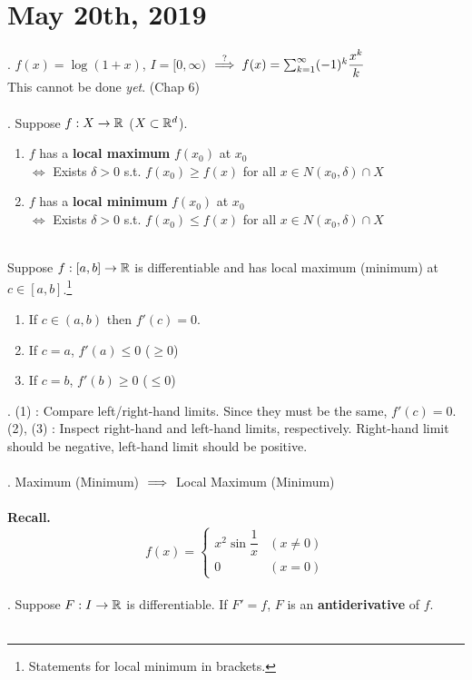 \section*{May 20th, 2019}

\ex. $f(x) = \log(1+x)$, $I=[0, \infty)$ $\overset{?}{\implies} f(x) = \sum_{k=1}^\infty (-1)^k\dfrac{x^k}{k}$\\
This cannot be done \textit{yet}. (Chap 6)\\
\\
. Suppose $f: X\rightarrow \mathbb{R}$ ($X\subset \mathbb{R}^d$).
\begin{enumerate}
	\item $f$ has a \textbf{local maximum} $f(x_0)$ at $x_0$ \\
	$\iff$ Exists $\delta > 0$ s.t. $f(x_0) \geq f(x)$ for all $x\in N(x_0, \delta)\cap X$ 
	\item $f$ has a \textbf{local minimum} $f(x_0)$ at $x_0$ \\
	$\iff$ Exists $\delta > 0$ s.t. $f(x_0) \leq f(x)$ for all $x\in N(x_0, \delta)\cap X$ 
\end{enumerate}~\\
 Suppose $f:[a, b]\rightarrow \mathbb{R}$ is differentiable and has local maximum (minimum) at $c\in [a, b]$.\footnote{Statements for local minimum in brackets.}
\begin{enumerate}
	\item If $c\in (a, b)$ then $f'(c) = 0$.
	\item If $c = a$, $f'(a) \leq 0$ ($\geq 0$)
	\item If $c = b$, $f'(b) \geq 0$ ($\leq 0$)
\end{enumerate}
\pf. (1) : Compare left/right-hand limits. Since they must be the same, $f'(c) = 0$.\\
(2), (3) : Inspect right-hand and left-hand limits, respectively. Right-hand limit should be negative, left-hand limit should be positive.\\
\\
\rmk. Maximum (Minimum) $\implies$ Local Maximum (Minimum)\\
\\
\textbf{Recall.} $$f(x) = \begin{cases}
x^2\sin\dfrac{1}{x} & (x \neq 0)\\
0 & (x= 0)
\end{cases}$$
\\
. Suppose $F:I\rightarrow \mathbb{R}$ is differentiable. If $F'=f$, $F$ is an \textbf{antiderivative} of $f$.\\
\\
